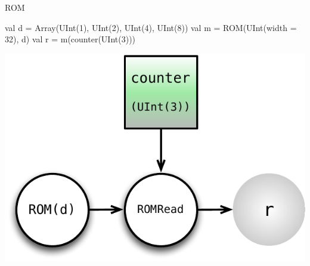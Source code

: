 \documentclass[xcolor=pdflatex,dvipsnames,table]{beamer}
\begin{document}



\begin{frame}[fragile]{ROM}

\begin{scala}
val d = Array(UInt(1), UInt(2), UInt(4), UInt(8))
val m = ROM(UInt(width = 32), d)
val r = m(counter(UInt(3)))
\end{scala}

\begin{center}
\includegraphics[height=0.7\textheight]{figs/rom.pdf} 
\end{center}

\end{frame}
\end{document}
